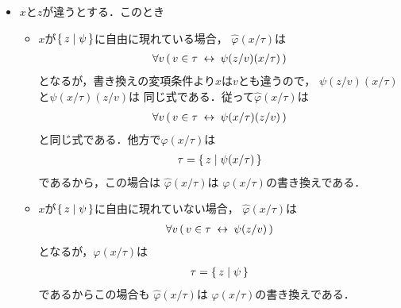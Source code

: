 \begin{metaprf}[第一]
\begin{description}
\begin{description}
\begin{itemize}
							\item $x$と$z$が違うとする．このとき
								\begin{itemize}
									\item $x$が$\{\, z \mid \psi\, \}$に自由に現れている場合，
										$\widehat{\varphi}(x/\tau)$は
										\begin{align}
											\forall v\, (\, v \in \tau \hspace{0.25em}\leftrightarrow\hspace{0.25em} \psi(z/v)(x/\tau)\, )
										\end{align}
										となるが，書き換えの変項条件より$x$は$v$とも違うので，
										$\psi(z/v)(x/\tau)$と$\psi(x/\tau)(z/v)$は
										同じ式である．従って$\widehat{\varphi}(x/\tau)$は
										\begin{align}
											\forall v\, (\, v \in \tau \hspace{0.25em}\leftrightarrow\hspace{0.25em} \psi(x/\tau)(z/v)\, )
										\end{align}
										と同じ式である．他方で$\varphi(x/\tau)$は
										\begin{align}
											\tau = \{\, z \mid \psi(x/\tau)\, \}
										\end{align}
										であるから，この場合は
										$\widehat{\varphi}(x/\tau)$は
										$\varphi(x/\tau)$の書き換えである．
										
									\item $x$が$\{\, z \mid \psi\, \}$に自由に現れていない場合，
										$\widehat{\varphi}(x/\tau)$は
										\begin{align}
											\forall v\, (\, v \in \tau \hspace{0.25em}\leftrightarrow\hspace{0.25em} \psi(z/v)\, )
										\end{align}
										となるが，$\varphi(x/\tau)$は
										\begin{align}
											\tau = \{\, z \mid \psi\, \}
										\end{align}
										であるからこの場合も
										$\widehat{\varphi}(x/\tau)$は
										$\varphi(x/\tau)$の書き換えである．
								\end{itemize}
						\end{itemize}
						

\end{description}
\end{description}
\end{metaprf}
